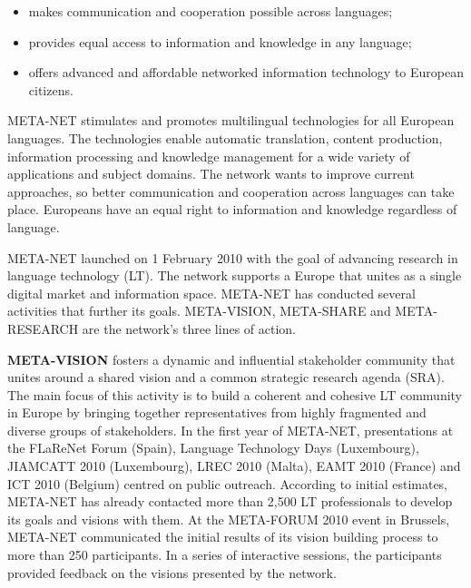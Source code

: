 \begin{multicols}{2}
\begin{itemize}
\begin{multicols}{2}
\begin{itemize}
\item makes communication and cooperation possible across languages;
\item provides equal access to information and knowledge in any language;
\item offers advanced and affordable networked information technology to European citizens.
\end{itemize}

META-NET stimulates and promotes multilingual technologies for all European languages. The technologies enable automatic translation, content production, information processing and knowledge management for a wide variety of applications and subject domains. The network wants to improve current approaches, so better communication and cooperation across languages can take place. Europeans have an equal right to information and knowledge regardless of language.

META-NET launched on 1 February 2010 with the goal of advancing research in language technology (LT). The network supports a Europe that unites as a single digital market and information space. META-NET has conducted several activities that further its goals. META-VISION, META-SHARE and META-RESEARCH are the network’s three lines of action.

\textbf{META-VISION} fosters a dynamic and influential stakeholder community that unites around a shared vision and a common strategic research agenda (SRA). The main focus of this activity is to build a coherent and cohesive LT community in Europe by bringing together representatives from highly fragmented and diverse groups of stakeholders. In the first year of META-NET, presentations at the FLaReNet Forum (Spain), Language Technology Days (Luxembourg), JIAMCATT 2010 (Luxembourg), LREC 2010 (Malta), EAMT 2010 (France) and ICT 2010 (Belgium) centred on public outreach. According to initial estimates, META-NET has already contacted more than 2,500 LT professionals to develop its goals and visions with them. At the META-FORUM 2010 event in Brussels, META-NET communicated the initial results of its vision building process to more than 250 participants. In a series of interactive sessions, the participants provided feedback on the visions presented by the network. 


\end{multicols}
\end{itemize}
\end{multicols}
